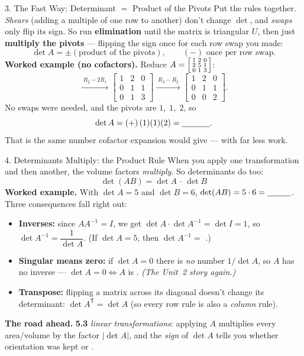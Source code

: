 \documentclass[10pt]{article}
\newcommand{\T}{\mathsf{T}}
\begin{document}
\begin{notesbox}{3. The Fast Way: Determinant $=$ Product of the Pivots}
Put the rules together. \emph{Shears} (adding a multiple of one row to another) don't change $\det$, and
\emph{swaps} only flip its sign. So run \textbf{elimination} until the matrix is triangular $U$, then
just \textbf{multiply the pivots} --- flipping the sign once for each row swap you made:
\[
  \det A = \pm(\text{product of the pivots}), \qquad (-)\text{ once per row swap}.
\]
\textbf{Worked example (no cofactors).} Reduce
$A=\begin{bsmallmatrix} 1 & 2 & 0 \\ 2 & 5 & 1 \\ 0 & 1 & 3 \end{bsmallmatrix}$:
\[
  \xrightarrow{\;R_2-2R_1\;}
  \begin{bmatrix} 1 & 2 & 0 \\ 0 & 1 & 1 \\ 0 & 1 & 3 \end{bmatrix}
  \xrightarrow{\;R_3-R_2\;}
  \begin{bmatrix} 1 & 2 & 0 \\ 0 & 1 & 1 \\ 0 & 0 & 2 \end{bmatrix}.
\]
No swaps were needed, and the pivots are $1,\;1,\;2$, so
\[
  \det A = (+)\,(1)(1)(2) = \blank{1.2cm}.
\]
That is the same number cofactor expansion would give --- with far less work.
\end{notesbox}

\begin{notesbox}{4. Determinants Multiply: the Product Rule}
When you apply one transformation and then another, the volume factors \emph{multiply}. So determinants
do too:
\[
  \boxed{\;\det(AB) = \det A \,\cdot\, \det B\;}
\]
\textbf{Worked example.} With $\det A=5$ and $\det B=6$,
$\det(AB)=5\cdot 6=\blank{1.0cm}$. Three consequences fall right out:
\begin{itemize}\setlength{\itemsep}{2pt}
  \item \textbf{Inverses:} since $A A^{-1}=I$, we get $\det A\cdot\det A^{-1}=\det I=1$, so
        $\det A^{-1}=\dfrac{1}{\det A}$. (If $\det A=5$, then $\det A^{-1}=$ \blank{1.0cm}.)
  \item \textbf{Singular means zero:} if $\det A=0$ there is \emph{no} number $1/\det A$, so $A$ has no
        inverse --- $\det A=0\Leftrightarrow A$ is \blank{1.9cm}. \emph{(The Unit~2 story again.)}
  \item \textbf{Transpose:} flipping a matrix across its diagonal doesn't change its determinant:
        $\det A^{\T}=\det A$ (so every row rule is also a \emph{column} rule).
\end{itemize}

\vspace{2pt}
\textbf{The road ahead.} \textbf{5.3} \emph{linear transformations}: applying $A$ multiplies every
area/volume by the factor $|\det A|$, and the \emph{sign} of $\det A$ tells you whether orientation was
kept or \blank{1.6cm}.
\end{notesbox}
\end{document}
